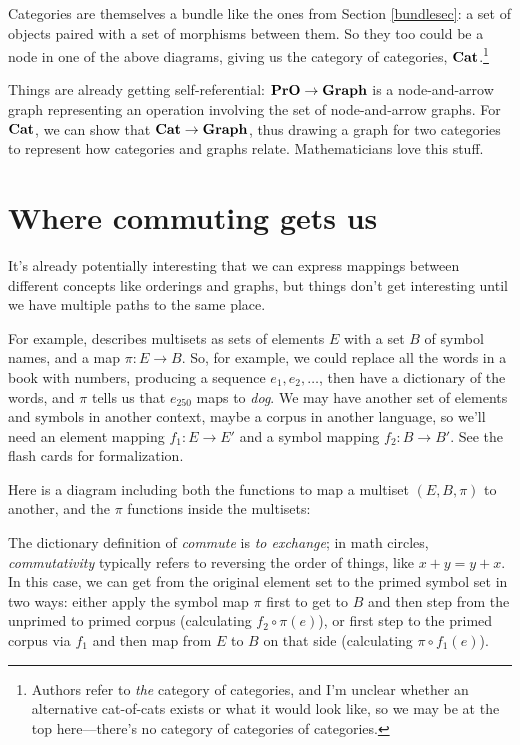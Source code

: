 \documentclass[11pt]{article}
\begin{document}
Categories are themselves a bundle like the ones from Section \ref{bundlesec}: a set
of objects paired with a set of morphisms between them. So they too could be a node in
one of the above diagrams, giving us the category of categories, ${\bf Cat}$.\footnote{Authors refer
to {\em the} category of categories, and I'm unclear whether an alternative cat-of-cats
exists or what it would look like, so we may be at the top here---there's no category of
categories of categories.}

Things are already getting self-referential: ${\bf PrO}\to {\bf Graph}$ is a
node-and-arrow graph representing an operation involving the set of node-and-arrow
graphs. For ${\bf Cat}$, we can show that ${\bf Cat}\to {\bf Graph}$, thus drawing a
graph for two categories to represent how categories and graphs relate.  Mathematicians
love this stuff.

\section{Where commuting gets us} It's already potentially interesting that we can
express mappings between different concepts like orderings and graphs, but things don't get
interesting until we have multiple paths to the same place.

For example,
\citet{spivak:category} describes multisets as sets of elements $E$ with a set $B$ of
symbol names, and a map $\pi:E\to B$. So, for example, we could replace all the words in a
book with numbers, producing a sequence $e_1, e_2, \dots$, then have a dictionary
of the words, and $\pi$ tells us that $e_{250}$ maps to {\em dog}. We
may have another set of elements and symbols in another context, maybe a corpus in
another language, so we'll need an element mapping $f_1:E\to E'$ and a symbol mapping
$f_2:B\to B'$. See the flash cards for formalization.

Here is a diagram including both
 the functions to map a multiset $(E, B, \pi)$ to another, and
the $\pi$ functions inside the multisets:

The dictionary definition of {\em
commute} is {\em to exchange}; in math circles, {\em commutativity} typically refers to
reversing the order of things, like $x+y = y+x$. In this case, we can 
get from the original element set to the primed symbol set in two ways:
either apply the symbol map $\pi$ first to get to $B$ and then step from the unprimed to
primed corpus (calculating $f_2\circ\pi(e)$), or first step to the primed corpus via $f_1$ and then
map from $E$ to $B$ on that side (calculating $\pi\circ f_1(e)$).
\end{document}
